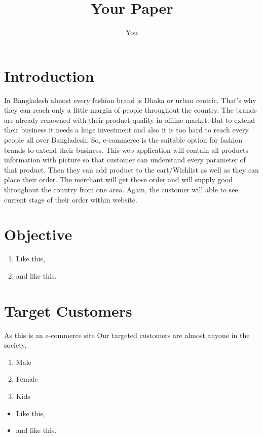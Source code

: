 \documentclass{article}
\title{Your Paper}
\author{You}
\begin{document}
\maketitle

\pagebreak


\section{Introduction}

In Bangladesh almost every fashion brand is Dhaka or urban centric. That's why they can reach only a little margin of people throughout the country. The brands are already renowned with their product quality in offline market. But to extend their business it needs a huge investment and also it is too hard to reach every people all over Bangladesh. So, e-commerce is the suitable option for fashion brands to extend their business. This web application will contain all products information with picture so that customer can understand every parameter of that product. Then they can add product to the cart/Wishlist as well as they can place their order. The merchant will get those order and will supply good throughout the country from one area. Again, the customer will able to see current stage of their order within website.



\section{Objective}

\begin{enumerate}
\item Like this,
\item and like this.
\end{enumerate}



\section{Target Customers}
As this is an e-commerce site Our targeted customers are almost anyone in the society.
\begin{enumerate}
\item Male
\item Female
\item Kids
\end{enumerate} 

\begin{itemize}
\item Like this,
\item and like this.
\end{itemize}
\end{document}
